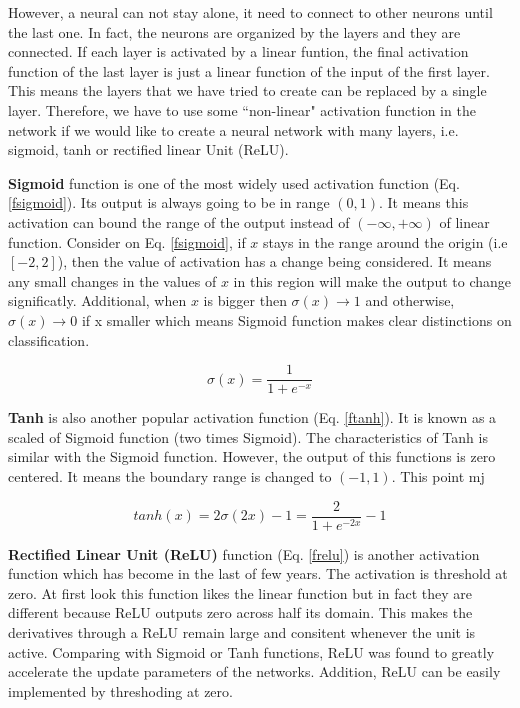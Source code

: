 However, a neural can not stay alone, it need to connect to other neurons until the last one. In fact, the neurons are organized by the layers and they are connected. If each layer is activated by a linear funtion, the final activation function of the last layer is  just a linear function of the input of the first layer. This means the layers that we have tried to create can be replaced by a single layer. Therefore, we have to use some ``non-linear" activation function in the network if we would like to create a neural network with many layers, i.e. sigmoid, tanh or rectified linear Unit (ReLU).

\textbf{Sigmoid} function is one of the most widely used activation function (Eq. \ref{fsigmoid}). Its output is always going to be in range $(0,1)$.  It means this activation can bound the range of the output instead of $(-\infty, +\infty )$ of linear function. Consider on Eq. \ref{fsigmoid}, if $x$ stays in the range around the origin (i.e $[-2,2]$), then the value of activation has a change being considered. It means any small changes in the values of $x$ in this region will make the output to change significatly. Additional, when $x$ is bigger then $\sigma(x) \rightarrow 1$ and otherwise, $\sigma(x) \rightarrow 0$ if x smaller which means Sigmoid function makes clear distinctions on classification.

\begin{equation}
	\sigma(x) = \frac{1}{1+e^{-x}}
	\label{fsigmoid}
\end{equation}

\textbf{Tanh} is also another popular activation function (Eq. \ref{ftanh}). It is known as a scaled of Sigmoid function (two times Sigmoid). The characteristics of Tanh is similar with the Sigmoid function. However, the output of this functions is zero centered. It means the boundary range is changed to $(-1, 1)$. This point mj 

\begin{equation}
	tanh(x) = 2\sigma(2x) - 1 = \frac{2}{1 + e^{-2x}} - 1
	\label{ftanh}
\end{equation}

\textbf{Rectified Linear Unit (ReLU)} function (Eq. \ref{frelu}) is another activation function which has become in the last of few years. The activation is threshold at zero. At first look this function likes the linear function but in fact they are different because ReLU outputs zero across half its domain. This makes the derivatives through a ReLU remain large and consitent whenever the unit is active. Comparing with Sigmoid or Tanh functions, ReLU was found to greatly accelerate the update parameters of the networks. Addition, ReLU can be easily implemented by threshoding at zero.

